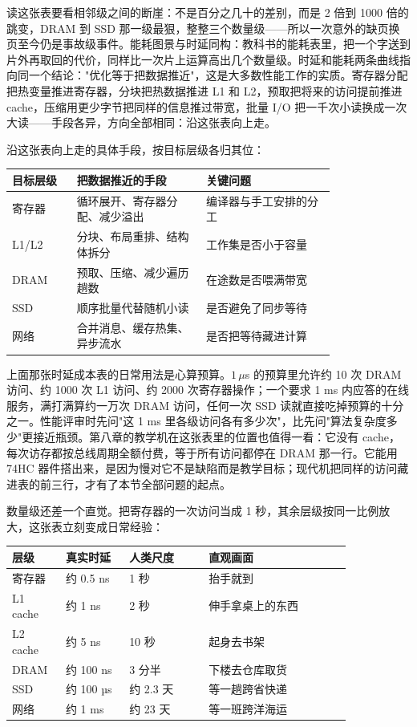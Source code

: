 读这张表要看相邻级之间的断崖：不是百分之几十的差别，而是 2 倍到 1000 倍的跳变，DRAM 到 SSD 那一级最狠，整整三个数量级——所以一次意外的缺页换页至今仍是事故级事件。能耗图景与时延同构：教科书的能耗表里，把一个字送到片外再取回的代价，同样比一次片上运算高出几个数量级。时延和能耗两条曲线指向同一个结论："优化等于把数据推近"，这是大多数性能工作的实质。寄存器分配把热变量推进寄存器，分块把热数据推进 L1 和 L2，预取把将来的访问提前推进 cache，压缩用更少字节把同样的信息推过带宽，批量 I/O 把一千次小读换成一次大读——手段各异，方向全部相同：沿这张表向上走。

沿这张表向上走的具体手段，按目标层级各归其位：

\begin{longtable}{L{0.16\linewidth}L{0.32\linewidth}L{0.32\linewidth}}
\toprule
目标层级 & 把数据推近的手段 & 关键问题 \\
\midrule
寄存器 & 循环展开、寄存器分配、减少溢出 & 编译器与手工安排的分工 \\
L1/L2 & 分块、布局重排、结构体拆分 & 工作集是否小于容量 \\
DRAM & 预取、压缩、减少遍历趟数 & 在途数是否喂满带宽 \\
SSD & 顺序批量代替随机小读 & 是否避免了同步等待 \\
网络 & 合并消息、缓存热集、异步流水 & 是否把等待藏进计算 \\
\bottomrule
\end{longtable}

上面那张时延成本表的日常用法是心算预算。$1\,\mu$s 的预算里允许约 10 次 DRAM 访问、约 1000 次 L1 访问、约 2000 次寄存器操作；一个要求 1 ms 内应答的在线服务，满打满算约一万次 DRAM 访问，任何一次 SSD 读就直接吃掉预算的十分之一。性能评审时先问"这 1 ms 里各级访问各有多少次"，比先问"算法复杂度多少"更接近瓶颈。第八章的教学机在这张表里的位置也值得一看：它没有 cache，每次访存都按总线周期全额付费，等于所有访问都停在 DRAM 那一行。它能用 74HC 器件搭出来，是因为慢对它不是缺陷而是教学目标；现代机把同样的访问藏进表的前三行，才有了本节全部问题的起点。

数量级还差一个直觉。把寄存器的一次访问当成 1 秒，其余层级按同一比例放大，这张表立刻变成日常经验：

\begin{longtable}{L{0.12\linewidth}L{0.16\linewidth}L{0.20\linewidth}L{0.36\linewidth}}
\toprule
层级 & 真实时延 & 人类尺度 & 直观画面 \\
\midrule
寄存器 & 约 0.5 ns & 1 秒 & 抬手就到 \\
L1 cache & 约 1 ns & 2 秒 & 伸手拿桌上的东西 \\
L2 cache & 约 5 ns & 10 秒 & 起身去书架 \\
DRAM & 约 100 ns & 3 分半 & 下楼去仓库取货 \\
SSD & 约 100 µs & 约 2.3 天 & 等一趟跨省快递 \\
网络 & 约 1 ms & 约 23 天 & 等一班跨洋海运 \\
\bottomrule
\end{longtable}

